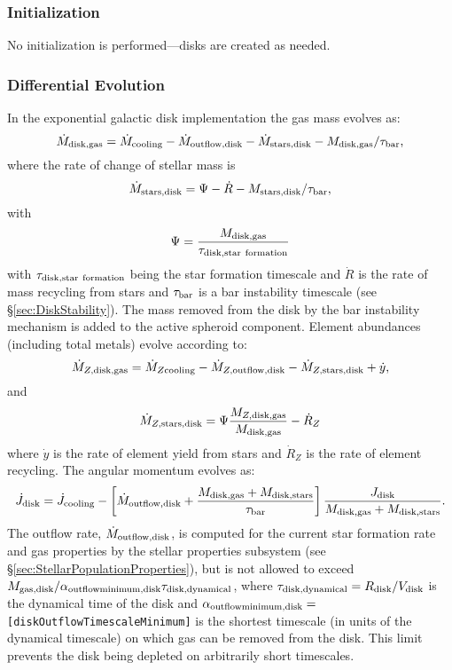 \subsubsection{Initialization}

No initialization is performed---disks are created as needed.

\subsubsection{Differential Evolution}

In the exponential galactic disk implementation the gas mass evolves as:
\begin{equation}
 \dot{M}_{\rm disk, gas} = \dot{M}_{\rm cooling} - \dot{M}_{\rm outflow, disk} - \dot{M}_{\rm stars, disk} - M_{\rm disk, gas}/\tau_{\rm bar},
\end{equation}
where the rate of change of stellar mass is
\begin{equation}
 \dot{M}_{\rm stars, disk} = \Psi - \dot{R} - M_{\rm stars,disk}/\tau_{\rm bar},
\end{equation}
with
\begin{equation}
 \Psi = {M_{\rm disk, gas} \over \tau_{\rm disk, star~formation}}
\end{equation}
with $\tau_{\rm disk, star~formation}$ being the star formation timescale and $\dot{R}$ is the rate of mass recycling from stars and $\tau_{\rm bar}$ is a bar instability timescale (see \S\ref{sec:DiskStability}). The mass removed from the disk by the bar instability mechanism is added to the active spheroid component.
Element abundances (including total metals) evolve according to:
\begin{equation}
  \dot{M}_{Z, {\rm disk, gas}} = \dot{M}_{Z {\rm cooling}} - \dot{M}_{Z, {\rm outflow, disk}} - \dot{M}_{Z, {\rm stars, disk}} + \dot{y},
\end{equation}
and
\begin{equation}
 \dot{M}_{Z, {\rm stars, disk}} = \Psi {M_{Z, {\rm disk, gas}} \over M_{\rm disk, gas}} - \dot{R}_Z
\end{equation}
where $\dot{y}$ is the rate of element yield from stars and $\dot{R}_Z$ is the rate of element recycling. The angular momentum evolves as:
\begin{equation}
 \dot{J}_{\rm disk} = \dot{J}_{\rm cooling} - \left[ \dot{M}_{\rm outflow, disk} + {M_{\rm disk, gas}  + M_{\rm disk, stars} \over \tau_{\rm bar}}\right] {J_{\rm disk} \over M_{\rm disk, gas} + M_{\rm disk, stars}}.
\end{equation}
The outflow rate, $\dot{M}_{\rm outflow, disk}$, is computed for the current star formation rate and gas properties by the stellar properties subsystem (see \S\ref{sec:StellarPopulationProperties}), but is not allowed to exceed $M_{\rm gas, disk}/ \alpha_{\rm outflow minimum, disk} \tau_{\rm disk, dynamical}$, where $\tau_{\rm disk, dynamical}=R_{\rm disk}/V_{\rm disk}$ is the dynamical time of the disk and $\alpha_{\rm outflow minimum, disk}=${\tt [diskOutflowTimescaleMinimum]} is the shortest timescale (in units of the dynamical timescale) on which gas can be removed from the disk. This limit prevents the disk being depleted on arbitrarily short timescales.

